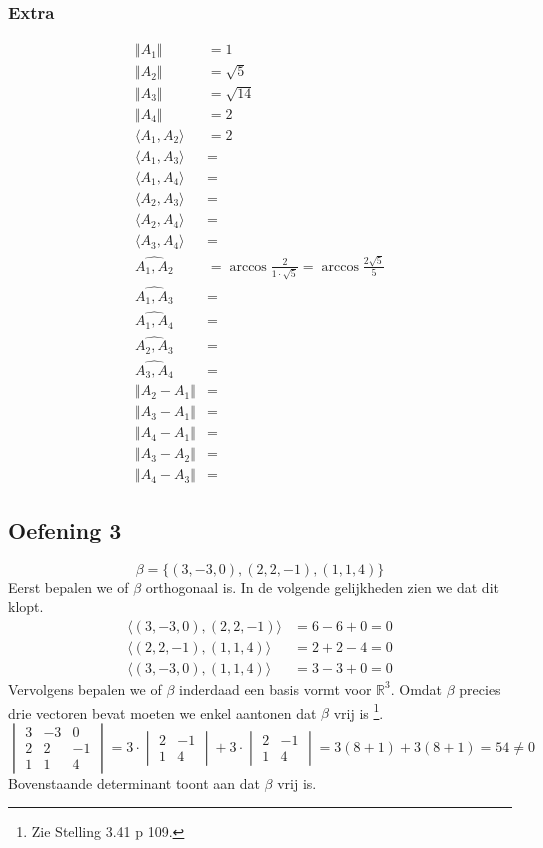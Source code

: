\documentclass[lineaire_algebra_oplossingen.tex]{subfiles}
\begin{document}
\subsubsection*{Extra}
\begin{align*}
\Vert A_1 \Vert 
&= 1 \\
\Vert A_2 \Vert 
&= \sqrt{5} \\
\Vert A_3 \Vert
&= \sqrt{14} \\
\Vert A_4 \Vert
&= 2 \\
\langle A_1,A_2 \rangle
&= 2 \\
\langle A_1,A_3 \rangle
&= \\
\langle A_1,A_4 \rangle
&= \\
\langle A_2,A_3 \rangle
&= \\
\langle A_2,A_4 \rangle
&= \\
\langle A_3,A_4 \rangle
&= \\
\widehat{A_1,A_2}
&= \arccos\frac{2}{1\cdot \sqrt{5}}
= \arccos\frac{2\sqrt{5}}{5} \\
\widehat{A_1,A_3}
&= \\
\widehat{A_1,A_4}
&= \\
\widehat{A_2,A_3}
&= \\
\widehat{A_3,A_4}
&= \\
\Vert A_2-A_1 \Vert
&= \\
\Vert A_3-A_1 \Vert
&= \\
\Vert A_4-A_1 \Vert
&= \\
\Vert A_3-A_2 \Vert
&= \\
\Vert A_4-A_3 \Vert
&=
\end{align*}

\subsection{Oefening 3}
\[
\beta = \{ (3,-3,0),(2,2,-1),(1,1,4) \}
\]
Eerst bepalen we of $\beta$ orthogonaal is.
In de volgende gelijkheden zien we dat dit klopt.
\begin{align*}
\langle (3,-3,0),(2,2,-1) \rangle &= 6-6+0 = 0 \\
\langle (2,2,-1),(1,1,4) \rangle &= 2+2-4 = 0 \\
\langle (3,-3,0),(1,1,4) \rangle &= 3-3+0 = 0
\end{align*}
Vervolgens bepalen we of $\beta$ inderdaad een basis vormt voor $\mathbb{R}^3$.
Omdat $\beta$ precies drie vectoren bevat moeten we enkel aantonen dat $\beta$ vrij is \footnote{Zie Stelling 3.41 p 109.}.
\[
\begin{vmatrix}
3 & -3 & 0\\
2 & 2 & -1\\
1 & 1 & 4
\end{vmatrix}
=
3 \cdot 
\begin{vmatrix}
2 & -1\\
1 & 4
\end{vmatrix}
+ 3 \cdot
\begin{vmatrix}
2 & -1\\
1 & 4
\end{vmatrix}
=
3(8+1)+3(8+1)
=54 \neq 0
\]
Bovenstaande determinant toont aan dat $\beta$ vrij is.
\end{document}
